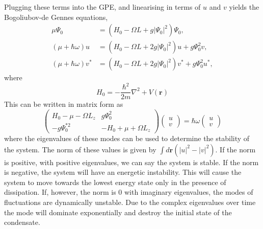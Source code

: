 Plugging these terms into the GPE, and linearising in terms of $u$ and $v$ yields the Bogoliubov-de Gennes equations,
\begin{subequations}\label{eqn:bogo_lhsrhs}
\begin{align}
    \mu \Psi_0 &= (H_0 - \Omega L + g |\Psi_0|^2)\Psi_0,\\
    (\mu +\hbar\omega)u &= (H_0 - \Omega L + 2g|\Psi_0|^2)u + g\Psi_0^2 v,\\
    (\mu +\hbar\omega)v^{*} &= (H_0 - \Omega L + 2g|\Psi_0|^2)v^{*} + g\Psi_0^2 u^{*},
\end{align}
\end{subequations}
where
\begin{equation}\label{eqn:bogo_h0}
H_0 = -\frac{\hbar^2}{2m}\nabla^2 + V(\mathbf{r})
\end{equation}
This can be written in matrix form as
\begin{equation}
    \begin{pmatrix}
        H_0 - \mu -\Omega L_z & g\Psi_0^2 \\
        -g\Psi_0^{*2} & -H_0 + \mu +\Omega L_z
    \end{pmatrix}
    \begin{pmatrix}
        u \\
        v
    \end{pmatrix}
    = \hbar\omega
    \begin{pmatrix}
        u \\
        v
    \end{pmatrix}
\end{equation}
where the eigenvalues of these modes can be used to determine the stability of the system. The norm of these values is given by $\int d\mathbf{r}(|u|^2 - |v|^2)$. If the norm is positive, with positive eigenvalues, we can say the system is stable. If the norm is negative, the system will have an energetic instability. This will cause the system to move towards the lowest energy state only in the presence of dissipation. If, however, the norm is 0 with imaginary eigenvalues, the modes of fluctuations are dynamically unstable. Due to the complex eigenvalues over time the mode will dominate exponentially and destroy the initial state of the condensate. %

